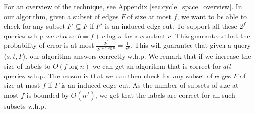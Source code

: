  \cycle*


For an overview of the technique, see Appendix \ref{sec:cycle_space_overview}. 
In our algorithm, given a subset of edges $F$ of size at most $f$, we want to be able to check for any subset $F' \subseteq F$ if $F'$ is an induced edge cut. To support all these $2^f$ queries w.h.p we choose $b=f+ c \log{n}$ for a constant $c$. This guarantees that the probability of error is at most $\frac{2^f}{2^{f+c\log{n}}}=\frac{1}{n^c}$. This will guarantee that given a query $\langle s,t,F \rangle$, our algorithm answers correctly w.h.p. We remark that if we increase the size of labels to $O(f \log{n})$ we can get an algorithm that is correct for \emph{all} queries w.h.p. 
The reason is that we can then check for any subset of edges $F$ of size at most $f$ if $F$ is an induced edge cut. As the number of subsets of size at most $f$ is bounded by $O(n^f)$, we get that the labels are correct for all such subsets w.h.p.


